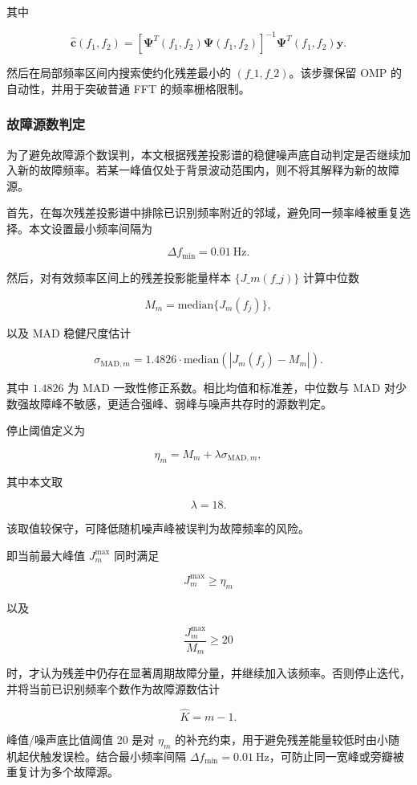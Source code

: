 其中


\[
\hat{\mathbf c}(f_1,f_2)
=
\left[\boldsymbol\Psi^T(f_1,f_2)\boldsymbol\Psi(f_1,f_2)\right]^{-1}
\boldsymbol\Psi^T(f_1,f_2)\mathbf y.
\]


然后在局部频率区间内搜索使约化残差最小的 \((f\_1,f\_2)\)。该步骤保留 OMP 的自动性，并用于突破普通 FFT 的频率栅格限制。


\subsubsection{故障源数判定}


为了避免故障源个数误判，本文根据残差投影谱的稳健噪声底自动判定是否继续加入新的故障频率。若某一峰值仅处于背景波动范围内，则不将其解释为新的故障源。


首先，在每次残差投影谱中排除已识别频率附近的邻域，避免同一频率峰被重复选择。本文设置最小频率间隔为


\[
\Delta f_{\min}=0.01\ \mathrm{Hz}.
\]


然后，对有效频率区间上的残差投影能量样本 \(\{J\_m(f\_j)\}\) 计算中位数


\[
M_m=\mathrm{median}\{J_m(f_j)\},
\]


以及 MAD 稳健尺度估计


\[
\sigma_{\mathrm{MAD},m}
=1.4826\cdot
\mathrm{median}\left(|J_m(f_j)-M_m|\right).
\]


其中 \(1.4826\) 为 MAD 一致性修正系数。相比均值和标准差，中位数与 MAD 对少数强故障峰不敏感，更适合强峰、弱峰与噪声共存时的源数判定。


停止阈值定义为


\[
\eta_m=M_m+\lambda\sigma_{\mathrm{MAD},m},
\]


其中本文取


\[
\lambda=18.
\]


该取值较保守，可降低随机噪声峰被误判为故障频率的风险。


即当前最大峰值 \(J_m^{\max}\) 同时满足


\[
J_m^{\max}\ge \eta_m
\]


以及


\[
\frac{J_m^{\max}}{M_m}\ge 20
\]


时，才认为残差中仍存在显著周期故障分量，并继续加入该频率。否则停止迭代，并将当前已识别频率个数作为故障源数估计


\[
\hat K=m-1.
\]


峰值/噪声底比值阈值 20 是对 \(\eta_m\) 的补充约束，用于避免残差能量较低时由小随机起伏触发误检。结合最小频率间隔 \(\Delta f_{\min}=0.01\ \mathrm{Hz}\)，可防止同一宽峰或旁瓣被重复计为多个故障源。


